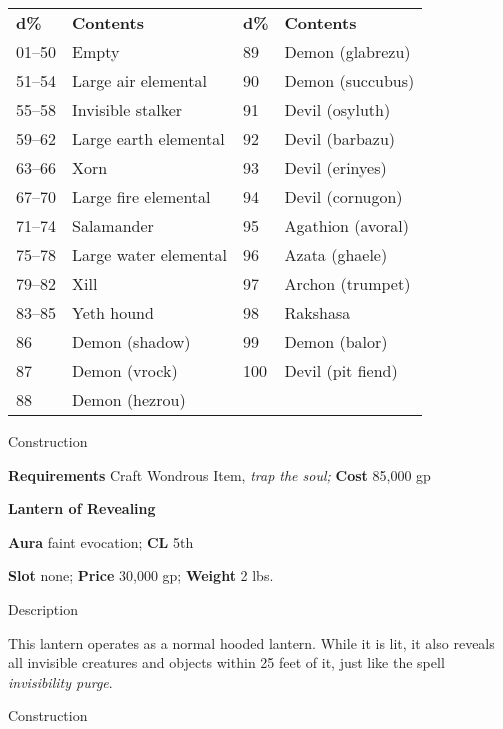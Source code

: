 \begin{tabular}{llll}
\textbf{d\%} & \textbf{Contents}     & \textbf{d\%} & \textbf{Contents}     \\
01--50        & Empty                 & 89           & Demon (glabrezu)      \\
51--54        & Large air elemental   & 90           & Demon (succubus)      \\
55--58        & Invisible stalker     & 91           & Devil (osyluth)       \\
59--62        & Large earth elemental & 92           & Devil (barbazu)       \\
63--66        & Xorn                  & 93           & Devil (erinyes)       \\
67--70        & Large fire elemental  & 94           & Devil (cornugon)      \\
71--74        & Salamander            & 95           & Agathion (avoral)     \\
75--78        & Large water elemental & 96           & Azata (ghaele)        \\
79--82        & Xill                  & 97           & Archon (trumpet)      \\
83--85        & Yeth hound            & 98           & Rakshasa              \\
86           & Demon (shadow)         & 99           & Demon (balor)         \\
87           & Demon (vrock)          & 100          & Devil (pit fiend)    \\
88           & Demon (hezrou)        \\
\end{tabular} 

Construction
				
\textbf{Requirements} Craft Wondrous Item,\textit{ trap the soul;}\textbf{ Cost }85,000 gp
				
\textbf{Lantern of Revealing}
				
\textbf{Aura} faint evocation;\textbf{ CL }5th
				
\textbf{Slot} none; \textbf{Price} 30,000 gp; \textbf{Weight} 2 lbs.
				
Description
				
This lantern operates as a normal hooded lantern. While it is lit, it also reveals all invisible creatures and objects within 25 feet of it, just like the spell \textit{invisibility purge}. 
				
Construction
				
